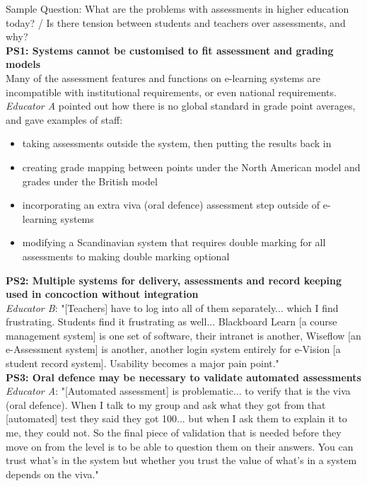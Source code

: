 Sample Question: What are the problems with assessments in higher education today? / 
Is there tension between students and teachers over assessments, and why? \vspace{0.25cm}\\
\textbf{PS1: Systems cannot be customised to fit assessment and grading models}\\
Many of the assessment features and functions on e-learning systems are incompatible 
with institutional requirements, or even national requirements. \textit{Educator A} pointed out how there is 
no global standard in grade point averages, and gave examples of staff:
\begin{itemize}
    \setlength\itemsep{0em}
    \item taking assessments outside the system, then putting the results back in
    \item creating grade mapping between points under the North American model and 
    grades under the British model
    \item incorporating an extra viva (oral defence) assessment step outside of e-learning systems
    \item modifying a Scandinavian system that requires double marking for all assessments 
    to making double marking optional
\end{itemize}
\textbf{PS2: Multiple systems for delivery, assessments and record keeping used in concoction without integration}\\
\textit{Educator B}: "[Teachers] have to log into all of them separately... which I find frustrating. Students 
find it frustrating as well... Blackboard Learn [a course management system] is one set of software, 
their intranet is another, Wiseflow [an e-Assessment system] is another, another login system entirely 
for e-Vision [a student record system]. Usability becomes a major pain point."\vspace{0.25cm}\\
\textbf{PS3: Oral defence may be necessary to validate automated assessments}\\
\textit{Educator A}: "[Automated assessment] is problematic... to verify that is the viva (oral defence).
When I talk to my group and ask what they got from that [automated] test they said they got 100... 
but when I ask them to explain it to me, they could not. So the final piece of validation that is needed
before they move on from the level is to be able to question them on their answers. You can trust 
what's in the system but whether you trust the value of what's in a system depends on the viva."\vspace{0.25cm}\\
